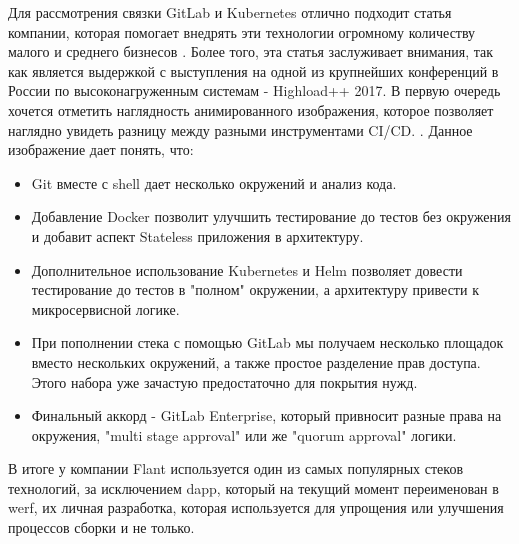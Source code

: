 Для рассмотрения связки GitLab и Kubernetes отлично подходит статья компании, которая помогает внедрять эти технологии огромному количеству малого и среднего бизнесов \cite{habr:flant:k8s-and-gitlab}. Более того, эта статья заслуживает внимания, так как является выдержкой с выступления на одной из крупнейших конференций в России по высоконагруженным системам - Highload++ 2017. В первую очередь хочется отметить наглядность анимированного изображения, которое позволяет наглядно увидеть разницу между разными инструментами CI/CD.
. Данное изображение дает понять, что:
\begin{itemize}
    \item Git
        вместе с shell
        дает несколько окружений и анализ кода.
    \item Добавление Docker позволит улучшить тестирование до тестов без окружения и добавит аспект Stateless
        приложения в архитектуру.
    \item Дополнительное использование Kubernetes и Helm позволяет довести тестирование до тестов в "полном" окружении, а архитектуру привести к микросервисной логике.
    \item При пополнении стека с помощью GitLab мы получаем несколько площадок вместо нескольких окружений, а также простое разделение прав доступа. Этого набора уже зачастую предостаточно для покрытия нужд.
    \item Финальный аккорд - GitLab Enterprise, который привносит разные права на окружения, "multi stage approval"
        или же "quorum approval"
        логики.
\end{itemize}
В итоге у компании Flant используется один из самых популярных стеков технологий, за исключением dapp, который на текущий момент переименован в werf, их личная разработка, которая используется для упрощения или улучшения процессов сборки и не только.

